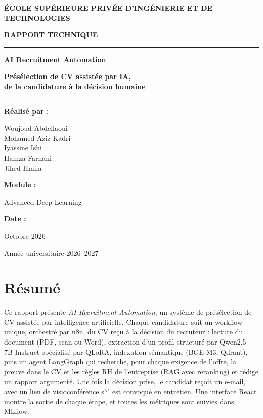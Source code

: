 \documentclass[11pt,a4paper]{report}
\begin{document}
\begin{titlepage}
\centering
\vspace*{2cm}
{\bfseries ÉCOLE SUPÉRIEURE PRIVÉE D'INGÉNIERIE ET DE\\TECHNOLOGIES\par}
\vspace{1.6cm}
{\bfseries RAPPORT TECHNIQUE\par}
\vspace{1.8cm}
\rule{\textwidth}{0.8pt}\par\vspace{0.3cm}
{\Huge\bfseries AI Recruitment Automation\par}
\vspace{0.35cm}
{\bfseries Présélection de CV assistée par IA,\\de la candidature à la décision humaine\par}
\vspace{0.3cm}
\rule{\textwidth}{0.4pt}\par
\vspace{2.4cm}
{\bfseries Réalisé par :\par}
\vspace{0.1cm}
Woujoud Abdellaoui\\Mohamed Aziz Kadri\\Iyassine Ishi\\Hamza Farhani\\Jihed Hmila\par
\vspace{0.6cm}
{\bfseries Module :\par}\vspace{0.1cm}
Advanced Deep Learning\par
\vspace{0.6cm}
{\bfseries Date :\par}\vspace{0.1cm}
Octobre 2026\par
\vfill
Année universitaire 2026--2027
\end{titlepage}

\pagestyle{plain}

\chapter*{Résumé}

Ce rapport présente \emph{AI Recruitment Automation}, un système de présélection de CV assistée par intelligence artificielle. Chaque candidature suit un workflow unique, orchestré par n8n, du CV reçu à la décision du recruteur : lecture du document (PDF, scan ou Word), extraction d'un profil structuré par Qwen2.5-7B-Instruct spécialisé par QLoRA, indexation sémantique (BGE-M3, Qdrant), puis un agent LangGraph qui recherche, pour chaque exigence de l'offre, la preuve dans le CV et les règles RH de l'entreprise (RAG avec reranking) et rédige un rapport argumenté. Une fois la décision prise, le candidat reçoit un e-mail, avec un lien de visioconférence s'il est convoqué en entretien. Une interface React montre la sortie de chaque étape, et toutes les métriques sont suivies dans MLflow.
\end{document}
